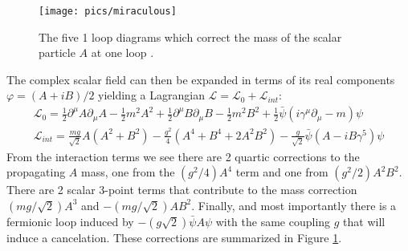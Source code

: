 \begin{figure}
\begin{center}
\caption{The five 1 loop diagrams which correct the mass of the scalar particle $A$ at one loop \cite{susybook}. \label{fig:miraculous}}
\texttt{[image: pics/miraculous]}
\end{center}
\end{figure}

The complex scalar field can then be expanded in terms of its real
 components $\varphi = (A+iB)/2$ yielding a Lagrangian
 $\mathcal{L}= \mathcal{L}_0 + \mathcal{L}_{int}$:
\begin{align*}
\mathcal{L}_0 = \frac{1}{2}\partial^\mu A \partial_\mu A - \frac{1}{2}m^2A^2 + \frac{1}{2}\partial^\mu B \partial_\mu B - \frac{1}{2}m^2 B^2 + \frac{1}{2}\bar{\psi}( i \gamma^\mu\partial_\mu - m) \psi \\
\mathcal{L}_{int} = \frac{mg}{\sqrt{2}}A(A^2 + B^2) - \frac{g^2}{4}(A^4+B^4+2A^2B^2) - \frac{g}{\sqrt{2}} \bar{\psi} (A-iB\gamma^5) \psi 
\end{align*}
From the interaction terms we see there are 2 quartic corrections to the propagating $A$ mass, one from the
$(g^2/4)A^4$ term and one from $(g^2/2)A^2B^2$. There are 2 scalar 3-point terms that contribute to the mass correction $(mg/\sqrt{2})A^3$ and $-(mg/\sqrt{2})AB^2$. Finally, and most importantly
there is a fermionic loop induced by $-(g\sqrt{2})\bar{\psi} A \psi$ with the same coupling $g$ that
will induce a cancelation. These corrections are summarized in Figure \ref{fig:miraculous}.

